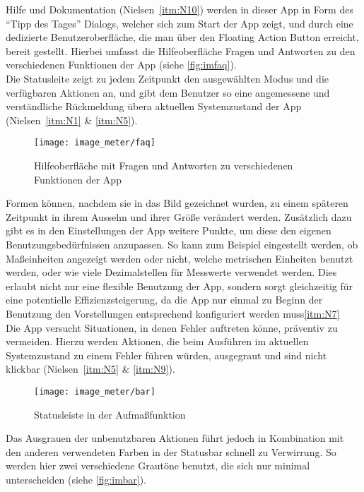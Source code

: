 Hilfe und Dokumentation (Nielsen~\autoref{itm:N10}) werden in dieser App in Form des ``Tipp des Tages'' Dialogs, welcher sich zum Start der App zeigt, und durch eine dedizierte Benutzeroberfläche, die man über den Floating Action Button erreicht, bereit gestellt. 
Hierbei umfasst die Hilfeoberfläche Fragen und Antworten zu den verschiedenen Funktionen der App (siehe \autoref{fig:imfaq}). \\

Die Statusleite zeigt zu jedem Zeitpunkt den ausgewählten Modus und die verfügbaren Aktionen an, und gibt dem Benutzer so eine angemessene und verständliche Rückmeldung übera aktuellen Systemzustand der App (Nielsen~\autoref{itm:N1} \& \autoref{itm:N5}).

\begin{wrapfigure}{R}{0.5\textwidth}
  \centering
  \texttt{[image: image\_meter/faq]}
  \caption{Hilfeoberfläche mit Fragen und Antworten zu verschiedenen Funktionen der App}
  \label{fig:imfaq}
\end{wrapfigure}

Formen können, nachdem sie in das Bild gezeichnet wurden, zu einem späteren Zeitpunkt in ihrem Aussehn und ihrer Größe verändert werden. Zusätzlich dazu gibt es in den Einstellungen der App weitere Punkte, um diese den eigenen Benutzungsbedürfnissen anzupassen.
So kann zum Beispiel eingestellt werden, ob Maßeinheiten angezeigt werden oder nicht, welche metrischen Einheiten benutzt werden, oder wie viele Dezimalstellen für Messwerte verwendet werden.
Dies erlaubt nicht nur eine flexible Benutzung der App, sondern sorgt gleichzeitig für eine potentielle Effizienzsteigerung, da die App nur einmal zu Beginn der Benutzung den Vorstellungen entsprechend konfiguriert werden muss\autoref{itm:N7} \\

Die App versucht Situationen, in denen Fehler auftreten könne, präventiv zu vermeiden.
Hierzu werden Aktionen, die beim Ausführen im aktuellen Systemzustand zu einem Fehler führen würden, ausgegraut und sind nicht klickbar (Nielsen~\autoref{itm:N5} \& \autoref{itm:N9}).

\begin{wrapfigure}{R}{0.5\textwidth}
  \centering
  \texttt{[image: image\_meter/bar]}
  \caption{Statusleiste in der Aufmaßfunktion}
  \label{fig:imbar}
\end{wrapfigure}

Das Ausgrauen der unbenutzbaren Aktionen führt jedoch in Kombination mit den anderen verwendeten Farben in der Statusbar schnell zu Verwirrung.
So werden hier zwei verschiedene Grautöne benutzt, die sich nur minimal unterscheiden (siehe \autoref{fig:imbar}). 

